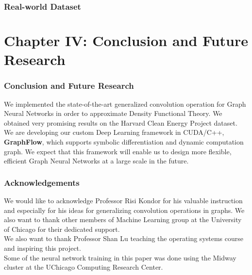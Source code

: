 \documentclass{beamer}
\begin{document}
\begin{frame}
\frametitle{Real-world Dataset}
\end{frame}

\section{Chapter IV: Conclusion and Future Research}

\begin{frame}
\frametitle{Conclusion and Future Research}
\begin{justify}
We implemented the state-of-the-art generalized convolution operation for Graph Neural Networks in order to approximate Density Functional Theory. We obtained very promising results on the Harvard Clean Energy Project dataset.
$$$$
We are developing our custom Deep Learning framework in CUDA/C++, \textbf{GraphFlow}, which supports symbolic differentiation and dynamic computation graph. We expect that this framework will enable us to design more flexible, efficient Graph Neural Networks at a large scale in the future.
\end{justify}
\end{frame}

\begin{frame}
\frametitle{Acknowledgements}
\begin{justify}
We would like to acknowledge Professor Risi Kondor for his valuable instruction and especially for his ideas for generalizing convolution operations in graphs. We also want to thank other members of Machine Learning group at the University of Chicago for their dedicated support.
$$$$
We also want to thank Professor Shan Lu teaching the operating systems course and inspiring this project.
$$$$
Some of the neural network training in this paper was done using the Midway cluster at the UChicago Computing Research Center.
\end{justify}
\end{frame}
\end{document}
